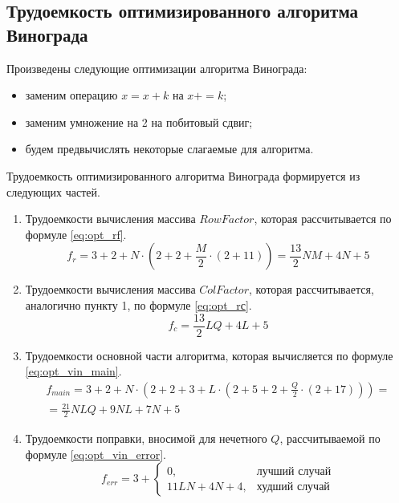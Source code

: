 \subsection{Трудоемкость оптимизированного алгоритма Винограда}

Произведены следующие оптимизации алгоритма Винограда:
\begin{itemize}
	\item заменим операцию $x = x + k$ на $x += k$;
	\item заменим умножение на 2 на побитовый сдвиг;
	\item будем предвычислять некоторые слагаемые для алгоритма.
\end{itemize}

Трудоемкость оптимизированного алгоритма Винограда формируется из следующих частей.
\begin{enumerate}
	\item Трудоемкости вычисления массива $RowFactor$, которая рассчитывается по формуле \eqref{eq:opt_rf}.
	\begin{equation}
		\label{eq:opt_rf}
		f_{r} = 3 + 2 + N \cdot (2 + 2 + \frac{M}{2} \cdot (2 + 11)) = \frac{13}{2}NM + 4N + 5
	\end{equation}
	
	\item Трудоемкости вычисления массива $ColFactor$, которая рассчитывается, аналогично пункту 1, по формуле \eqref{eq:opt_rс}.
	\begin{equation}
		\label{eq:opt_rс}
		f_{c} = \frac{13}{2}LQ + 4L + 5
	\end{equation}
	
	\item Трудоемкости основной части алгоритма, которая вычисляется по формуле \eqref{eq:opt_vin_main}.
	\begin{equation}
		\label{eq:opt_vin_main}
		\begin{gathered}
			f_{main} = 3 + 2 + N \cdot (2 + 2 + 3 + L \cdot (2 + 5 + 2 + \frac{Q}{2} \cdot (2 + 17))) = \\
			= \frac{21}{2} NLQ + 9NL + 7N + 5
		\end{gathered}
	\end{equation}
	
	\item Трудоемкости поправки, вносимой для нечетного $Q$, рассчитываемой по формуле \eqref{eq:opt_vin_error}.
	\begin{equation}
		\label{eq:opt_vin_error}
		f_{err} = 3 +
		\begin{cases}
			0, & \text{лучший случай}\\
			11LN + 4N + 4, & \text{худший случай}
		\end{cases}
	\end{equation}
	
\end{enumerate}


